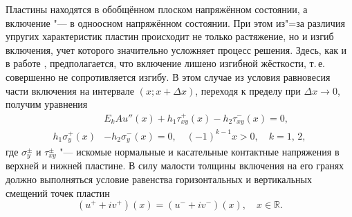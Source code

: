 Пластины находятся в обобщённом плоском напряжённом состоянии, а включение "--- в одноосном напряжённом состоянии. При этом
из"=за различия упругих характеристик пластин происходит не только растяжение, но и изгиб включения, учет которого значительно
усложняет процесс решения. Здесь, как и в работе \cite{silsmi:bib:pmm}, предполагается, что включение лишено изгибной жёсткости,
т.\,е. совершенно не сопротивляется изгибу. В этом случае из условия равновесия части включения на интервале $(x; x+\Delta x)$,
переходя к пределу при $\Delta x\to 0$, получим уравнения
\begin{equation}
\begin{aligned}
&E_k A u''(x) + h_1 \tau_{xy}^+ (x) - h_2 \tau_{xy}^- (x)=0,\\
h_1 \sigma_y^+(x)&-h_2\sigma_y^-(x)=0, \quad (-1)^{k-1}x>0,\quad k=1,\,2, \label{silsmi:eq1}
\end{aligned}
\end{equation}
где $\sigma_y^\pm$ и $\tau_{xy}^\pm$ "--- искомые нормальные и касательные контактные напряжения в верхней и нижней пластине. В
силу малости толщины включения на его гранях должно выполняться условие равенства горизонтальных и вертикальных смещений точек
пластин \cite{silsmi:bib:chobanan}
\begin{equation}
\label{silsmi:eq2}
(u^++iv^+)(x)=(u^-+iv^-)(x),\quad x\in\mathbb{R}.
\end{equation}

